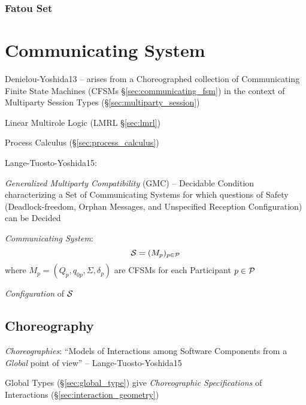 \subsubsection{Fatou Set}\label{sec:fatou_set}



\section{Communicating System}\label{sec:communicating_system}

Denielou-Yoshida13 -- arises from a Choreographed collection of
Communicating Finite State Machines (CFSMs
\S\ref{sec:communicating_fsm}) in the context of Multiparty Session
Types (\S\ref{sec:multiparty_session})

Linear Multirole Logic (LMRL \S\ref{sec:lmrl})

\fist Process Calculus (\S\ref{sec:process_calculus})

Lange-Tuosto-Yoshida15:

\emph{Generalized Multiparty Compatibility} (GMC) -- Decidable
Condition characterizing a Set of Communicating Systems for which
questions of Safety (Deadlock-freedom, Orphan Messages, and
Unspecified Reception Configuration) can be Decided

\emph{Communicating System}:
\[
  \mathcal{S} = (M_p)_{p \in \mathcal{P}}
\]
where $M_p = (Q_p, q_{0p}, \Sigma, \delta_p)$ are CFSMs for each
Participant $p \in \mathcal{P}$

\emph{Configuration} of $\mathcal{S}$ %



\subsection{Choreography}\label{sec:choreography}

\emph{Choreographies}: ``Models of Interactions among Software
Components from a \emph{Global} point of view'' --
Lange-Tuosto-Yoshida15

\fist Global Types (\S\ref{sec:global_type}) give \emph{Choreographic
  Specifications} of Interactions (\S\ref{sec:interaction_geometry})



